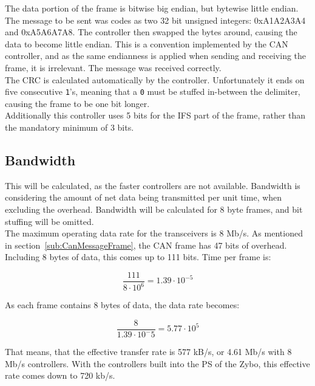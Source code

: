 The data portion of the frame is bitwise big endian, but bytewise little endian. 
The message to be sent was codes as two 32 bit unsigned integers: 0xA1A2A3A4 and 0xA5A6A7A8.
The controller then swapped the bytes around, causing the data to become little endian.
This is a convention implemented by the CAN controller, and as the same endianness is applied when sending and receiving the frame, it is irrelevant. 
The message was received correctly.\\

The CRC is calculated automatically by the controller.
Unfortunately it ends on five consecutive \texttt{1}'s, meaning that a \texttt{0} must be stuffed in-between the delimiter, causing the frame to be one bit longer.\\

Additionally this controller uses 5 bits for the IFS part of the frame, rather than the mandatory minimum of 3 bits. 

\subsection{Bandwidth}\label{sub:CAN_bandwidth}
This will be calculated, as the faster controllers are not available.
Bandwidth is considering the amount of net data being transmitted per unit time, when excluding the overhead.
Bandwidth will be calculated for 8 byte frames, and bit stuffing will be omitted.\\

The maximum operating data rate for the transceivers is 8 Mb/s.
As mentioned in section~\ref{sub:CanMessageFrame}, the CAN frame has 47 bits of overhead. 
Including 8 bytes of data, this comes up to 111 bits. 
Time per frame is:

\begin{equation}
\frac{111}{8 \cdot 10^6} = 1.39 \cdot 10^{-5}
\end{equation}

As each frame contains 8 bytes of data, the data rate becomes:

\begin{equation}
\frac{8}{1.39 \cdot 10^-5}= 5.77 \cdot 10^5
\end{equation}

That means, that the effective transfer rate is 577 kB/s, or 4.61 Mb/s with 8 Mb/s controllers. 
With the controllers built into the PS of the Zybo, this effective rate comes down to 720 kb/s.

